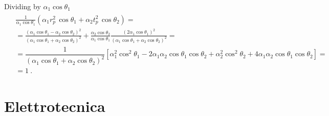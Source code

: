 \documentclass[letterpaper,10pt,italian]{jupyterBook}
\begin{document}
\sphinxAtStartPar
Dividing by \(\alpha_1 \cos  \theta_1\)
\begin{equation*}
\begin{split}\begin{aligned}
 & \frac{1}{\alpha_1 \cos \theta_1} \left( \alpha_1 r_p^2 \, \cos \theta_1 + \alpha_2 t_p^2 \, \cos \theta_2 \right) = \\
 & = \frac{\left(\alpha_1 \cos \theta_1 - \alpha_2 \cos \theta_2\right)^2}{\left(\alpha_1 \cos \theta_1 + \alpha_2 \cos \theta_2\right)^2} + \frac{\alpha_2 \cos \theta_2}{\alpha_1 \cos \theta_1} \frac{\left( 2 \alpha_1 \cos \theta_1 \right)^2}{\left( \alpha_1 \cos \theta_1 + \alpha_2 \cos \theta_2 \right)^2} = \\
  & = \dfrac{1}{\left( \alpha_1 \cos \theta_1 + \alpha_2 \cos \theta_2 \right)^2} \left[ \alpha_1^2 \cos^2 \theta_1 - 2 \alpha_1 \alpha_2 \cos \theta_1 \cos \theta_2 + \alpha_2^2 \cos^2 \theta_2 + 4 \alpha_1 \alpha_2 \cos \theta_1 \cos \theta_2 \right] = \\
  & = 1 \ .
\end{aligned}\end{split}
\end{equation*}
\sphinxstepscope


\part{Elettrotecnica}

\sphinxstepscope
\end{document}
